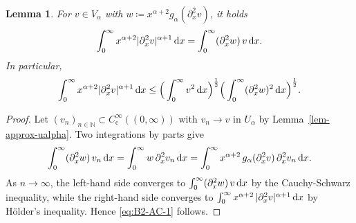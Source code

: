 \documentclass[reqno,12pt]{amsart}
\renewcommand{\d}{\ensuremath{\mathrm{d}}}
\newcommand{\N}{\ensuremath{\mathbb{N}}}
\renewcommand{\d}{\ensuremath{{\rm d}}}
\newtheorem{lemma}[theorem]{Lemma}
\numberwithin{equation}{section}
\begin{document}
%

%
\begin{lemma}\label{lem:B2-AC}
For $v \in V_\alpha$ with $w \coloneq x^{\alpha+2} g_\alpha(\partial_x^2 v)$, it holds 
%
\begin{equation}\label{eq:B2-AC-1}
\int_0^\infty x^{\alpha+2} |\partial_x^2 v|^{\alpha+1}\, \d x = \int_0^\infty (\partial_x^2 w)\, v\, \d x. 
\end{equation}
%
In particular,
\begin{equation}\label{eq:B2-AC}
\int_0^\infty x^{\alpha+2} |\partial_x^2 v|^{\alpha+1}\, \d x
\le \Big(\int_0^\infty v^2\, \d x\Big)^{\frac 1 2}
\Big(\int_0^\infty (\partial_x^2 w)^2\, \d x\Big)^{\frac 1 2}.
\end{equation}
\end{lemma}
%

%
\begin{proof}
Let $(v_n)_{n \in \N} \subset C^\infty_\mathrm{c}((0,\infty))$ with
$v_n \to v$ in $U_\alpha$ by Lemma~\ref{lem-approx-ualpha}.
Two integrations by parts
give
%
\[
\int_0^\infty (\partial_x^2 w)\, v_n\, \d x
= \int_0^\infty w\, \partial_x^2 v_n\, \d x
= \int_0^\infty x^{\alpha+2}\, g_\alpha(\partial_x^2 v)\,
\partial_x^2 v_n\, \d x .
\]
%
As $n \to \infty$, the left-hand side converges to
$\int_0^\infty (\partial_x^2 w)\, v\, \d x$ by the Cauchy-Schwarz inequality, 
while the right-hand side converges to
$\int_0^\infty x^{\alpha+2}\, |\partial_x^2 v|^{\alpha+1}\, \d x$
by H\"older's inequality. 
Hence \eqref{eq:B2-AC-1} follows. 
\end{proof}
%

%
\end{document}
